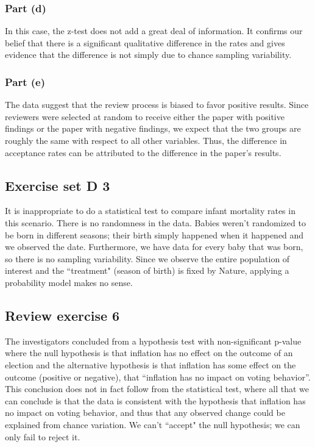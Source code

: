 \documentclass[11pt]{article}
\begin{document}
\subsubsection*{Part (d)}
In this case, the z-test does not add a great deal of information.  It confirms our belief that there is a significant qualitative difference in the rates and gives evidence that the difference is not simply due to chance sampling variability.

\subsubsection*{Part (e)}
The data suggest that the review process is biased to favor positive results.  Since reviewers were selected at random to receive either the paper with positive findings or the paper with negative findings, we expect that the two groups are roughly the same with respect to all other variables.  Thus, the difference in acceptance rates can be attributed to the difference in the paper's results.

\subsection*{Exercise set D 3} %
It is inappropriate to do a statistical test to compare infant mortality rates in this scenario.  There is no randomness in the data.  Babies weren't randomized to be born in different seasons; their birth simply happened when it happened and we observed the date.  Furthermore, we have data for every baby that was born, so there is no sampling variability.  Since we observe the entire population of interest and the ``treatment" (season of birth) is fixed by Nature, applying a probability model makes no sense.




\subsection*{Review exercise 6} %


The investigators concluded from a hypothesis test with non-significant p-value where the null hypothesis is that inflation has no effect on the outcome of an election and the alternative hypothesis is that inflation has some effect on the outcome (positive or negative), that ``inflation has no impact on voting behavior''. This conclusion does not in fact follow from the statistical test, where all that we can conclude is that the data is consistent with the hypothesis that inflation has no impact on voting behavior, and thus that any observed change could be explained from chance variation.  We can't ``accept" the null hypothesis; we can only fail to reject it.
\end{document}

